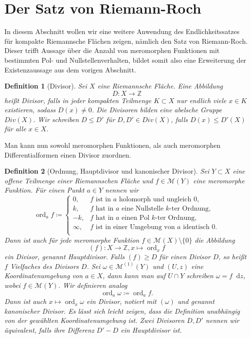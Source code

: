 \documentclass[11pt,a4paper,toc=bibliography]{scrartcl}
\theoremstyle{def}
\newtheorem{defi}{Definition}[section]
\theoremstyle{thm}
\theoremstyle{remark}
\DeclareMathOperator{\ord}{ord}
\newcommand*\dif{\mathop{}\!\mathrm{d}}\newcommand{\einschraenkung}{\,\rule[-5pt]{0.4pt}{12pt}\,{}} %
\begin{document}
\section{Der Satz von Riemann-Roch}
In diesem Abschnitt wollen wir eine weitere Anwendung des Endlichkeitssatzes für kompakte Riemannsche Flächen zeigen, nämlich den Satz von Riemann-Roch. Dieser trifft Aussage über die Anzahl von meromorphen Funktionen mit bestimmten Pol- und Nullstellenverhalten, bildet somit also eine Erweiterung der Existenzaussage aus dem vorigen Abschnitt.
\begin{defi}[Divisor]
	Sei $X$ eine Riemannsche Fläche. Eine Abbildung
	\[D:X\rightarrow\mathbb{Z}
	\]
	heißt \emph{Divisor}, falls in jeder kompakten Teilmenge $K\subset X$ nur endlich viele $x\in K$ existieren, sodass $D(x)\neq 0$. Die Divisoren bilden eine abelsche Gruppe $Div(X)$. Wir schreiben $D\leq D'$ für $D,D'\in Div(X)$, falls $D(x)\leq D'(X)$ für alle $x\in X$.
\end{defi}
Man kann nun sowohl meromorphen Funktionen, als auch meromorphen Differentialformen einen Divisor zuordnen.
\nomenclature[Oe]{$\ord_a f$}{\nomrefpage}
\begin{defi}[Ordnung, Hauptdivisor und kanonischer Divisor]
	Sei $Y\subset X$ eine offene Teilmenge einer Riemannschen Fläche und $f\in \mathcal{M}(Y)$ eine meromorphe Funktion. Für einen Punkt $a\in Y$ nennen wir 
	\[
	\textstyle{\ord_a}f\coloneqq \begin{cases}
	0,& f\text{ ist in }a\text{ holomorph und ungleich }0,\\
	k,&f\text{ hat in }a\text{ eine Nullstelle }k\text{-ter Ordnung},\\
	-k,&f\text{ hat in }a\text{ einen Pol }k\text{-ter Ordnung},\\
	\infty,&f\text{ ist in einer Umgebung von }a\text{ identisch }0.\\
	\end{cases}
	\]
	Dann ist auch für jede meromorphe Funktion $f\in \mathcal{M}(X)\setminus \{0\}$ die Abbildung 
	\[
	(f):X\rightarrow \mathbb{Z},
	x\mapsto \ord_x f
	\]
	ein Divisor, genannt \emph{Hauptdivisor}. Falls $(f)\geq D$ für einen Divisor $D$, so heißt $f$ \emph{Vielfaches} des Divisors $D$.
	Sei $\omega\in\mathcal{M}^{(1)}(Y)$ und $(U,z)$ eine Koordinatenumgebung von $a\in X$, dann kann man auf $U\cap Y$ schreiben $\omega =f\dif z$, wobei $f\in\mathcal{M}(Y)$. Wir definieren analog
	\[\textstyle{\ord_a}\omega\coloneqq \textstyle{\ord_a}f.
	\]
	Dann ist auch $x\mapsto \ord_x\omega$ ein Divisor, notiert mit $(\omega)$ und genannt \emph{kanonischer Divisor}. Es lässt sich leicht zeigen, dass die Definition unabhängig von der gewählten Koordinatenumgebung ist. Zwei Divisoren $D,D'$ nennen wir \emph{äquivalent}, falls ihre Differenz $D'-D$ ein Hauptdivisor ist.
\end{defi}
\end{document}
